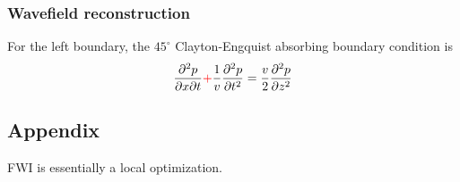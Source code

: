 \subsubsection{Wavefield reconstruction}
For the left boundary, the $45^\circ$ Clayton-Engquist
absorbing boundary condition is
\[ \frac{\partial^2 p}{\partial x\partial t} {\color{red}+} \frac{1}{v}
  \frac{\partial^2 p}{\partial t^2} = \frac{v}{2}
  \frac{\partial^2 p}{\partial z^2} \]

\subsection{Appendix}
FWI is essentially a local optimization.

